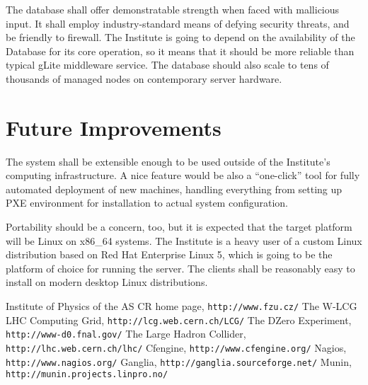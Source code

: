 \documentclass{article}
\begin{document}
The database shall offer demonstratable strength when faced with mallicious input.  It shall employ industry-standard means of
defying security threats, and be friendly to firewall.  The Institute is going to depend on the availability of the Database for
its core operation, so it means that it should be more reliable than typical gLite middleware service.  The database should also
scale to tens of thousands of managed nodes on contemporary server hardware.  

\section{Future Improvements}

The system shall be extensible enough to be used outside of the Institute's computing infrastructure.  A nice feature would be
also a ``one-click'' tool for fully automated deployment of new machines, handling everything from setting up PXE environment for
installation to actual system configuration.

Portability should be a concern, too, but it is expected that the target platform will be Linux on x86\_64 systems.  The Institute
is a heavy user of a custom Linux distribution based on Red Hat Enterprise Linux 5, which is going to be the platform of choice
for running the server.  The clients shall be reasonably easy to install on modern desktop Linux distributions.

\begin{thebibliography}{9}
    Institute of Physics of the AS CR home page, {\tt http://www.fzu.cz/}
    The W-LCG LHC Computing Grid, {\tt http://lcg.web.cern.ch/LCG/}
    The DZero Experiment, {\tt http://www-d0.fnal.gov/}
    The Large Hadron Collider, {\tt http://lhc.web.cern.ch/lhc/}
    Cfengine, {\tt http://www.cfengine.org/}
    Nagios, {\tt http://www.nagios.org/}
    Ganglia, {\tt http://ganglia.sourceforge.net/}
    Munin, {\tt http://munin.projects.linpro.no/}
\end{thebibliography}
\end{document}
